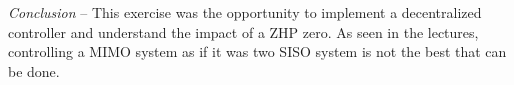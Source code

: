\vspace{.5cm}
\hrulefill
\vspace{.5cm}

\begin{bfseries}
\emph{Conclusion} -- This exercise was the opportunity to implement a decentralized controller and understand the impact of a ZHP zero. 
As seen in the lectures, controlling a MIMO system as if it was two SISO system is not the best that can be done. 
\end{bfseries}
